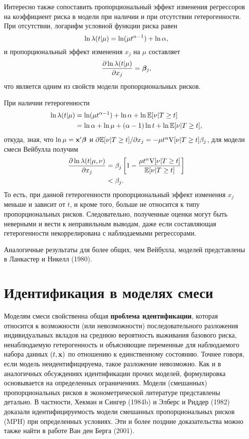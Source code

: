 Интересно также сопоставить пропорциональный эффект изменения регрессоров на коэффициент риска в модели при наличии и при отсутствии гетерогенности. При отсутствии, логарифм условной функции риска равен
    $$\ln\lambda(t|\mu) = \ln(\mu t^{\alpha-1}) + \ln\alpha,$$
и пропорциональный эффект изменения $x_j$ на $\mu$ составляет
    $$\frac{\partial\ln\lambda(t|\mu)}{\partial x_j} = \bm{\beta}_j,$$
что является одним из свойств модели пропорциональных рисков.

При наличии гетерогенности
    \begin{align}
        \ln\lambda(t|\mu) &= \ln(\mu t^{\alpha-1}) + \ln\alpha + \ln\mathbb{E}[\nu|T\ge t] \notag \\
                      &= \ln\alpha + \ln\mu + (\alpha-1)\ln t + \ln\mathbb{E}[\nu|T\ge t], \notag
    \end{align}
откуда, зная, что $\ln\mu = \mathbf{x}'\bm{\beta}$ и $\partial\mathbb{E}[\nu|T\ge t]/\partial x_j = -\mu t^{\alpha}\mathrm{V}[\nu|T\ge t]\beta_j$, для модели смеси Вейбулла получим
    \begin{align}
        \label{eq:18.16}
        \frac{\partial\ln\lambda(t|\mu,\nu)}{\partial x_j} &= \beta_j \left[ 1 - \frac{\mu t^\alpha \mathrm{V}[\nu|T\ge t]}{\mathbb{E}[\nu|T\ge t]} \right] \\
                                             &< \beta_j. \notag
    \end{align}
То есть, при данной гетерогенности пропорциональный эффект изменения $x_j$ меньше и зависит от $t$, и кроме того, больше не относится к типу пропорциональных рисков. Следовательно, полученные оценки могут быть неверными и вести к неправильным выводам, даже если составляющая  гетерогенности некоррелирована с наблюдаемыми регрессорами.

Аналогичные результаты для более общих, чем Вейбулла, моделей представлены в Ланкастер и Никелл (1980).




\section{Идентификация в моделях смеси}\label{sec:18.3}

\noindent
Моделям смеси свойственна общая \textbf{проблема идентификации}, которая относится к возможности (или невозможности) последовательного разложения индивидуальных вкладов на среднюю вероятность выживания базового риска, ненаблюдаемую гетерогенность и объясняющие переменные для наблюдаемого набора данных $(t,\mathbf{x})$ по отношению к единственному состоянию. Точнее говоря, если модель неидентифицируема, такое разложение невозможно. Как и в аналогичных обсуждениях идентификации прочих моделей, формулировка
основывается на определенных ограничениях. Модели (смешанных) пропорциональных рисков в эконометрической литературе представлены детально. В частности, Хекман и Сингер (1984b) и Элберс и Риддер (1982) доказали идентифицируемость модели смешанных пропорциональных рисков (MPH) при определенных условиях. Эти и более поздние доказательства можно также найти в работе Ван ден Берга (2001).

